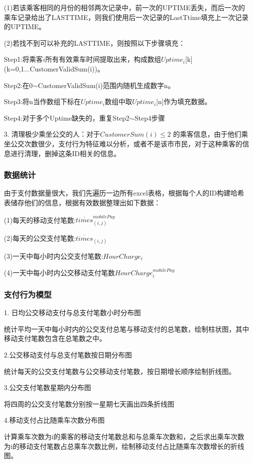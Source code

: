 \documentclass[withoutpreface,bwprint]{cumcmthesis} %
\begin{document}
(1)若该乘客相同的月份的相邻两次记录中，前一次的UPTIME丢失，而后一次的乘车记录给出了LASTTIME，则我们使用后一次记录的LastTtime填充上一次记录的UPTIME。

(2)若找不到可以补充的LASTTIME，则按照以下步骤填充：

Step1:将乘客$i$所有有效乘车时间提取出来，构成数组$Uptime_i$[k](k=0,1...CustomerValidSum(i))。

Step2:在0$\sim$CustomerValidSum(i)范围内随机生成数字n。

Step3:将n当作数组下标在$Uptime_i$数组中取$Uptime_i$[n]作为填充数据。

Step4:对于多个Uptime缺失的，重复Step2$\sim$Step4步骤

3. 清理极少乘坐公交的人：对于$CustomerSum(i)\leq2$ 的乘客信息，由于他们乘坐公交次数很少，支付行为特征难以分析，或者不是该市市民，对于这种乘客的信息进行清理，删掉这条ID相关的信息。

\subsubsection{数据统计}

由于支付数据量很大，我们先遍历一边所有excel表格，根据每个人的ID构建哈希表储存他们的信息，根据有效数据整理出如下数据：

(1)每天的移动支付笔数:$\overline {times}^{mobilePay}_{(i,j)}​$

(2)每天的公交支付笔数:$\overline {times}_{(i,j)}$

(3)一天中每小时内公交支付笔数:$HourCharge_{i}$

(4)一天中每小时内公交移动支付笔数$HourCharge_{i}^{mobilePay}$

\subsubsection{支付行为模型}

1. 日均公交移动支付与总支付笔数小时分布图

统计平均一天中每小时内的公交支付总笔与移动支付的总笔数，绘制柱状图，其中移动支付笔数包含在总笔数之中。

2.公交移动支付与总支付笔数按日期分布图

统计每天的公交支付笔数与公交移动支付笔数，按日期增长顺序绘制折线图。

3.公交支付笔数星期内分布图

将四周的公交支付笔数分别按一星期七天画出四条折线图

4.移动支付占比随乘车次数分布图

计算乘车次数为i的乘客的移动支付笔数总和与总乘车次数和，之后求出乘车次数为i的移动支付笔数占总乘车次数比例，绘制移动支付占比随乘车次数增长的折线图。
\end{document}
